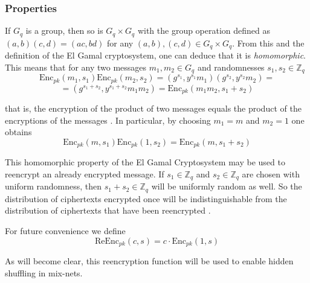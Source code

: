 \subsubsection{Properties}
If $G_q$ is a group, then so is $G_q \times G_q$ with the group
operation defined as $(a,b)(c,d) = (a c, b d)$ for any $(a,b),(c,d)
\in G_q \times G_q$. From this and the definition of the El Gamal
cryptosystem, one can deduce that it is \emph{homomorphic}. This means that
for any two messages $m_1, m_2 \in G_q$ and randomnesses $s_1, s_2 \in
\mathbb{Z}_q$
$$
 \mathrm{Enc}_{pk}(m_1, s_1)\mathrm{Enc}_{pk}(m_2, s_2) =
(g^{s_1}, y^{s_1}m_1)(g^{s_2},y^{s_2}m_2) =
$$
$$
= (g^{s_1 + s_2}, y^{s_1 + s_2}m_1m_2) = \mathrm{Enc}_{pk}(m_1m_2, s_1 + s_2)
$$

that is, the encryption of the product of two messages equals the
product of the encryptions of the messages \cite[p.~289]{hac}. In
particular, by choosing $m_1 = m$ and $m_2 = 1$ one obtains
$$
\mathrm{Enc}_{pk}(m, s_1) \mathrm{Enc}_{pk}(1, s_2) = \mathrm{Enc}_{pk}(m, s_1 + s_2)
$$

This homomorphic property of the El Gamal Cryptosystem may be used to
reencrypt an already encrypted message. If $s_1 \in \mathbb{Z}_q$ and
$s_2 \in \mathbb{Z}_q$ are chosen with uniform randomness, then $s_1 +
s_2 \in \mathbb{Z}_q$ will be uniformly random as well. So the
distribution of ciphertexts encrypted once will be indistinguishable
from the distribution of ciphertexts that have been reencrypted
\cite[p.~1]{wikstrom1}.

For future convenience we define
$$
\mathrm{ReEnc}_{pk}(c,s) = c \cdot \mathrm{Enc}_{pk}(1,s) 
$$

As will become clear, this reencryption function will be used to
enable hidden shuffling in mix-nets.

